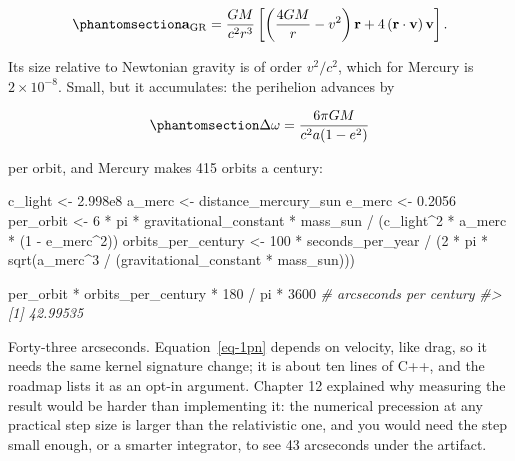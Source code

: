 \documentclass[
  10.5pt,
  letterpaper,
]{scrbook}
\newenvironment{Shaded}{\begin{snugshade}}{\end{snugshade}}
\newcommand{\CommentTok}[1]{\textcolor[rgb]{0.00,0.00,0.00}{\textit{#1}}}
\newcommand{\DecValTok}[1]{\textcolor[rgb]{0.00,0.00,0.00}{#1}}
\newcommand{\FloatTok}[1]{\textcolor[rgb]{0.00,0.00,0.00}{#1}}
\newcommand{\FunctionTok}[1]{\textcolor[rgb]{0.00,0.00,0.00}{#1}}
\newcommand{\NormalTok}[1]{\textcolor[rgb]{0.00,0.00,0.00}{#1}}
\newcommand{\OtherTok}[1]{\textcolor[rgb]{0.00,0.00,0.00}{#1}}
\newcommand{\SpecialCharTok}[1]{\textcolor[rgb]{0.00,0.00,0.00}{#1}}
\theoremstyle{definition}
\theoremstyle{plain}
\theoremstyle{remark}
\begin{document}
\begin{equation}\protect\phantomsection\label{eq-1pn}{
\mathbf{a}_{\mathrm{GR}} = \frac{GM}{c^2 r^3}\left[\left(\frac{4GM}{r} - v^2\right)\mathbf{r} + 4\,(\mathbf{r}\cdot\mathbf{v})\,\mathbf{v}\right].
}\end{equation}

Its size relative to Newtonian gravity is of order \(v^2/c^2\), which
for Mercury is \(2\times10^{-8}\). Small, but it accumulates: the
perihelion advances by

\begin{equation}\protect\phantomsection\label{eq-gr-precession}{
\Delta\omega = \frac{6\pi GM}{c^2 a(1-e^2)}
}\end{equation}

per orbit, and Mercury makes 415 orbits a century:

\begin{Shaded}
\begin{Highlighting}[]
\NormalTok{c\_light }\OtherTok{\textless{}{-}} \FloatTok{2.998e8}
\NormalTok{a\_merc  }\OtherTok{\textless{}{-}}\NormalTok{ distance\_mercury\_sun}
\NormalTok{e\_merc  }\OtherTok{\textless{}{-}} \FloatTok{0.2056}
\NormalTok{per\_orbit }\OtherTok{\textless{}{-}} \DecValTok{6} \SpecialCharTok{*}\NormalTok{ pi }\SpecialCharTok{*}\NormalTok{ gravitational\_constant }\SpecialCharTok{*}\NormalTok{ mass\_sun }\SpecialCharTok{/}\NormalTok{ (c\_light}\SpecialCharTok{\^{}}\DecValTok{2} \SpecialCharTok{*}\NormalTok{ a\_merc }\SpecialCharTok{*}\NormalTok{ (}\DecValTok{1} \SpecialCharTok{{-}}\NormalTok{ e\_merc}\SpecialCharTok{\^{}}\DecValTok{2}\NormalTok{))}
\NormalTok{orbits\_per\_century }\OtherTok{\textless{}{-}} \DecValTok{100} \SpecialCharTok{*}\NormalTok{ seconds\_per\_year }\SpecialCharTok{/}\NormalTok{ (}\DecValTok{2} \SpecialCharTok{*}\NormalTok{ pi }\SpecialCharTok{*} \FunctionTok{sqrt}\NormalTok{(a\_merc}\SpecialCharTok{\^{}}\DecValTok{3} \SpecialCharTok{/}\NormalTok{ (gravitational\_constant }\SpecialCharTok{*}\NormalTok{ mass\_sun)))}

\NormalTok{per\_orbit }\SpecialCharTok{*}\NormalTok{ orbits\_per\_century }\SpecialCharTok{*} \DecValTok{180} \SpecialCharTok{/}\NormalTok{ pi }\SpecialCharTok{*} \DecValTok{3600}      \CommentTok{\# arcseconds per century}
\CommentTok{\#\textgreater{} [1] 42.99535}
\end{Highlighting}
\end{Shaded}

Forty-three arcseconds. Equation~\ref{eq-1pn} depends on velocity, like
drag, so it needs the same kernel signature change; it is about ten
lines of C++, and the roadmap lists it as an opt-in argument. Chapter 12
explained why measuring the result would be harder than implementing it:
the numerical precession at any practical step size is larger than the
relativistic one, and you would need the step small enough, or a smarter
integrator, to see 43 arcseconds under the artifact.
\end{document}
